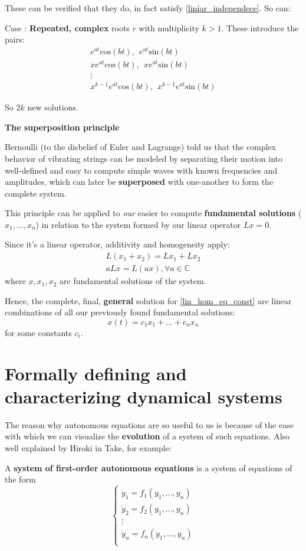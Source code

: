 These can be verified that they do, in fact satisfy \ref{liniar_independece}. So can:

Case : \textbf{Repeated, complex} roots $r$ with multiplicity $k>1$. These introduce the pairs:
\begin{align*}
	e^{at}\text{cos}(bt), \ \  e^{at}\text{sin}(bt)  \\
	xe^{at}\text{cos}(bt), \ \ xe^{at}\text{sin}(bt) \\
	\vdots                                           \\
	x^{k-1}e^{at}\text{cos}(bt), \ \ x^{k-1}e^{at}\text{sin}(bt)
\end{align*}

So $2k$ new solutions.

\textbf{The superposition principle}\cite{Hiroki2015}

Bernoulli (to the disbelief of Euler and Lagrange) told us that the complex behavior of vibrating strings can be modeled by separating their motion into well-defined and easy to compute simple waves with known frequencies and amplitudes, which can later be \textbf{superposed} with one-another to form the complete system.

This principle can be applied to \textit{our} easier to compute \textbf{fundamental solutions} ($x_1,\dots,x_n$) in relation to the system formed by our linear operator $Lx =0$.

Since it's a linear operator, additivity and homogeneity apply:
\begin{gather*}
	L(x_1+x_2) = Lx_1 + Lx_2\\
	aLx = L(ax) , \forall a \in \mathbb{C}
\end{gather*}
where $x,x_1,x_2$ are fundamental solutions of the system.

Hence, the complete, final, \textbf{general} solution for \ref{lin_hom_eq_const} are linear combinations of all our previously found fundamental solutions:
\[
	x(t) = c_1 x_1 + \dots + c_nx_n
\]
for some constants $c_i$.
\newpage
\section{Formally defining and characterizing dynamical systems}\label{ch:dynamical_systems}
The reason why autonomous equations are so useful to us is because of the ease with which we can visualize the \textbf{evolution} of a system of such equations. Also well explained by Hiroki in \cite{Hiroki2015}
Take, for example:
\begin{definition}
	A \textbf{system of first-order autonomous equations} is a system of equations of the form
	\begin{equation}\label{fo_system_auton_eq}
		\begin{cases}
			\dot{y}_1 = f_1(y_1,\dots, y_n) \\
			\dot{y}_2 = f_2(y_1,\dots, y_n) \\
			\vdots                          \\
			\dot{y}_n = f_n(y_1,\dots, y_n) \\
		\end{cases}
	\end{equation}
\end{definition}

